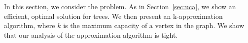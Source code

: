 \section{\ca{}}
In this section, we consider the \ca{} problem.
As in Section~\ref{sec:uca}, we show an efficient, optimal solution for trees.
We then present an k-approximation algorithm, where $k$ is the maximum capacity
of a vertex in the graph.
We show that our analysis of the approximation algorithm is tight.

